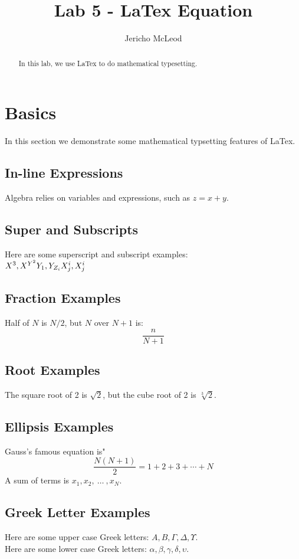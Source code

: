 \documentclass[11pt]{article}
\title{Lab 5 - LaTex Equation}
\author{Jericho McLeod}
\begin{document}
\maketitle

\begin{abstract}
In this lab, we use LaTex to do mathematical typesetting.
\end{abstract}

\section{Basics}
In this section we demonstrate some mathematical typsetting features of LaTex.

\subsection{In-line Expressions}
Algebra relies on variables and expressions, such as $z = x +y$.

\subsection{Super and Subscripts}
Here are some superscript and subscript examples: \\
$X^{3}, X^{Y^{2}} \\
Y_{1}, Y_{Z_{i}} \\
X^{i}_{j}, X_{j}^{i}$

\subsection{Fraction Examples}
Half of $N$ is $N/2$, but $N$ over $N+1$ is: \[\frac{n} {N+1}\]

\subsection{Root Examples}
The square root of 2 is $\sqrt{2}$, but the cube root of 2 is $\sqrt[3]{2}$.

\subsection{Ellipsis Examples}
Gauss's famous equation is" \[ \frac{N(N+1)}{2} = 1 + 2 + 3 + \cdots + N \] 
A sum of terms is $x_{1}, x_{2}, ~\ldots~, x_{N}$.

\subsection{Greek Letter Examples}
Here are some upper case Greek letters: $A, B, \Gamma, \Delta, \Upsilon$.\\
Here are some lower case Greek letters: $\alpha, \beta, \gamma, \delta, \upsilon$.\\
\end{document}
